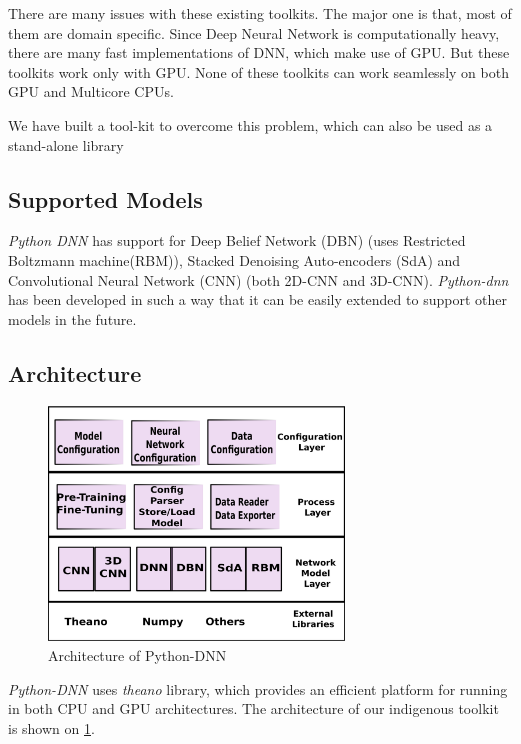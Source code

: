 There are many issues with these existing toolkits.  The major one is that, most of them are domain specific.  Since Deep Neural Network is computationally heavy, there are many fast implementations of DNN, which make use of GPU.  But these toolkits work only with GPU.  None of these toolkits can work seamlessly on both GPU and Multicore CPUs. 

We have built a tool-kit to overcome this problem, which can also be used as a stand-alone library


\subsection{Supported Models}
\label{sec:python-dnnModels}
\textit{Python DNN}  has support  for Deep Belief Network (DBN) \cite{hinton2002training} (uses Restricted Boltzmann machine(RBM)), Stacked Denoising Auto-encoders (SdA) \cite{vincent2010stacked} and Convolutional Neural Network (CNN) \cite{lecun1998gradient} (both 2D-CNN and 3D-CNN). \textit{Python-dnn} has been developed in such a way that it can be easily extended to support other models in the future.

\subsection{Architecture}

\begin{figure}[ht]
\centering
\includegraphics[width=0.7\textwidth]{./imgs/Python-DNNArch.eps}
\caption{Architecture of Python-DNN}
\label{fig:pydnn-arch}
\end{figure}

\textit{Python-DNN} uses \emph{theano} library, which provides an efficient platform for running in both CPU and GPU architectures.  The architecture of our indigenous toolkit is shown on \ref{fig:pydnn-arch}. 

